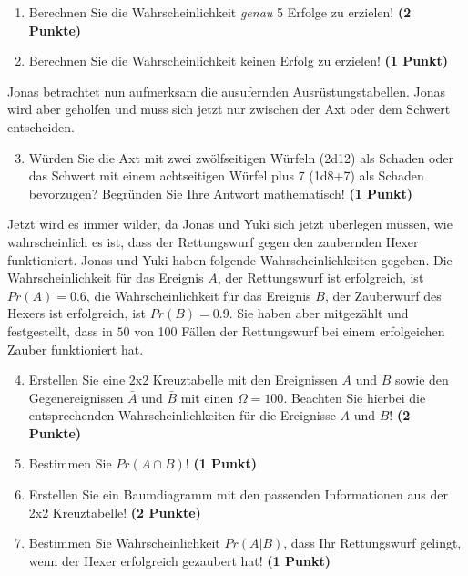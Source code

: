 \documentclass[a4paper, 9pt]{scrartcl}\usepackage[]{graphicx}\usepackage[]{xcolor}
\begin{document}
\begin{enumerate}
\item Berechnen Sie die Wahrscheinlichkeit \textit{genau} 5 Erfolge zu erzielen!  \textbf{(2 Punkte)}
\item Berechnen Sie die Wahrscheinlichkeit keinen Erfolg zu erzielen! \textbf{(1 Punkt)}
\end{enumerate}

Jonas betrachtet nun aufmerksam die ausufernden Ausrüstungstabellen. Jonas wird aber geholfen und muss sich jetzt nur zwischen der Axt oder dem Schwert entscheiden.

\begin{enumerate}
  \setcounter{enumi}{2}
\item Würden Sie die Axt mit zwei zwölfseitigen Würfeln (2d12) als Schaden oder das Schwert mit einem achtseitigen Würfel plus 7 (1d8+7) als Schaden bevorzugen? Begründen Sie Ihre Antwort mathematisch! \textbf{(1 Punkt)}
\end{enumerate}

Jetzt wird es immer wilder, da Jonas und Yuki sich jetzt überlegen müssen, wie wahrscheinlich es ist, dass der Rettungswurf gegen den zaubernden Hexer funktioniert. Jonas und Yuki haben folgende Wahrscheinlichkeiten gegeben. Die Wahrscheinlichkeit für das Ereignis $A$, der Rettungswurf ist erfolgreich, ist $Pr(A) = 0.6$, die Wahrscheinlichkeit für das Ereignis $B$, der Zauberwurf des Hexers ist erfolgreich, ist $Pr(B) = 0.9$. Sie haben aber mitgezählt und festgestellt, dass in $50$ von 100 Fällen der Rettungswurf bei einem erfolgeichen Zauber funktioniert hat.  

\begin{enumerate}
  \setcounter{enumi}{3}
\item Erstellen Sie eine 2x2 Kreuztabelle mit den Ereignissen $A$ und $B$ sowie den Gegenereignissen $\bar{A}$ und $\bar{B}$ mit einen $\Omega = 100$. Beachten Sie hierbei die entsprechenden Wahrscheinlichkeiten für die Ereignisse $A$ und $B$! \textbf{(2 Punkte)}
\item Bestimmen Sie $Pr(A \cap B)$! \textbf{(1 Punkt)}
\item Erstellen Sie ein Baumdiagramm mit den passenden Informationen aus der 2x2 Kreuztabelle! \textbf{(2 Punkte)}
\item Bestimmen Sie Wahrscheinlichkeit $Pr(A|B)$, dass Ihr Rettungswurf gelingt, wenn der Hexer erfolgreich gezaubert hat! \textbf{(1 Punkt)}
\end{enumerate}

  
\clearpage
\end{document}
